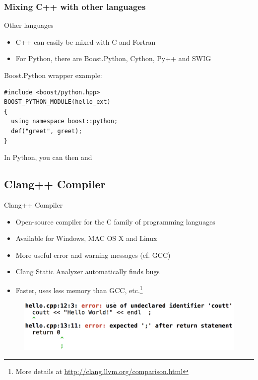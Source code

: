 \documentclass[compress]{beamer}
\begin{document}
\begin{frame}[fragile]
\frametitle{Mixing C++ with other languages}
\begin{exampleblock}{Other languages}
	\begin{itemize}
		\item C++ can easily be mixed with C and Fortran
		\item For Python, there are Boost.Python, Cython, Py++ and SWIG
	\end{itemize}
\end{exampleblock}

Boost.Python wrapper example:
\begin{lstlisting}
#include <boost/python.hpp>
BOOST_PYTHON_MODULE(hello_ext)
{
  using namespace boost::python;
  def("greet", greet);
}
\end{lstlisting}

In Python, you can then  and 



\end{frame}

\subsection{Clang++ Compiler}
\begin{frame}{Clang++ Compiler}

\begin{itemize}
	\item Open-source compiler for the C family of programming languages
	\item Available for Windows, MAC OS X and Linux
	\item More useful error and warning messages (cf. GCC)
	\item Clang Static Analyzer automatically finds bugs
	\item Faster, uses less memory than GCC, etc.\footnote{More details at \hyperlink{http://clang.llvm.org/comparison.html}{http://clang.llvm.org/comparison.html}}
\end{itemize}

	\begin{figure}
		\centering
		\includegraphics[width=0.8\linewidth]{figures/clang_error.png}
	\end{figure}
\end{frame}
\end{document}
